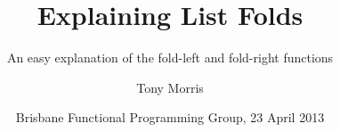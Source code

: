 \documentclass{beamer}
\author{
  {\small Tony Morris\\}
}
\begin{document}
\title{\large Explaining List Folds}
\subtitle{\tiny{An easy explanation of the fold-left and fold-right functions}}

\date{{\footnotesize Brisbane Functional Programming Group, 23 April 2013}}

\begin{frame}
  \titlepage
\end{frame}







\end{document}
